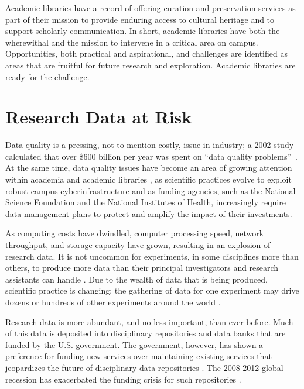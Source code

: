 \documentclass[12pt,letterpaper,titlepage,onecolumn,biblatex,backend=biber,style=chicago-authordate]{article}
\begin{document}
Academic libraries have a record of offering curation and preservation
services as part of their mission to provide enduring access to
cultural heritage and to support scholarly communication.  In short,
academic libraries have both the wherewithal and the mission to
intervene in a critical area on campus. Opportunities, both practical
and aspirational, and challenges are identified as areas that are
fruitful for future research and exploration. Academic libraries are
ready for the challenge.

\section{Research Data at Risk}
Data quality is a pressing, not to mention costly, issue in industry;
a 2002 study \autocite{russom:case} calculated that over \$600 billion per
year was spent on ``data quality problems''\ 
\autocite{eckerson:bottomline}.  At the same time, data quality issues
have become an area of growing attention within academia and academic
libraries \autocite{heidorn:libraries,arl:stewardship,ogburn:imperative,jisc:deluge},
as scientific practices evolve to exploit robust campus
cyberinfrastructure and as funding agencies, such as the National
Science Foundation and the National Institutes of Health, increasingly
require data management plans to protect and amplify the impact of
their investments.

As computing costs have dwindled, computer processing speed, network
throughput, and storage capacity have grown, resulting in an explosion
of research data.  It is not uncommon for experiments, in some
disciplines more than others, to produce more data than their
principal investigators and research assistants can
handle \autocite{adams:galaxyzoo}. Due to the wealth of data that is
being produced, scientific practice is changing; the gathering of data
for one experiment may drive dozens or hundreds of other experiments
around the world \autocite{jisc:deluge}.

Research data is more abundant, and no less important, than ever
before. Much of this data is deposited into disciplinary repositories
and data banks that are funded by the
U.S. government\autocite{merali:peril,baker:funding}. The government,
however, has shown a preference for funding new services over
maintaining existing services that jeopardizes the future of
disciplinary data repositories \autocite{merali:peril}. The 2008-2012
global recession has exacerbated the funding crisis for such
repositories \autocite{baker:funding}.
\end{document}
